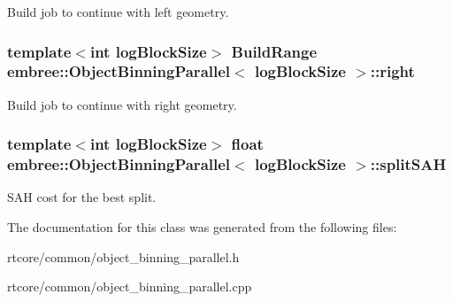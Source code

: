 Build job to continue with left geometry. 

\hypertarget{classembree_1_1_object_binning_parallel_a9bc006f56e93a16bc1d070e8db742533}{
\subsubsection[{right}]{\setlength{\rightskip}{0pt plus 5cm}template$<$int logBlockSize$>$ {\bf BuildRange} {\bf embree::ObjectBinningParallel}$<$ logBlockSize $>$::{\bf right}}}
\label{classembree_1_1_object_binning_parallel_a9bc006f56e93a16bc1d070e8db742533}


Build job to continue with right geometry. 

\hypertarget{classembree_1_1_object_binning_parallel_a41d417b66e217e9f1703404fdc57f8db}{
\subsubsection[{splitSAH}]{\setlength{\rightskip}{0pt plus 5cm}template$<$int logBlockSize$>$ float {\bf embree::ObjectBinningParallel}$<$ logBlockSize $>$::{\bf splitSAH}}}
\label{classembree_1_1_object_binning_parallel_a41d417b66e217e9f1703404fdc57f8db}


SAH cost for the best split. 



The documentation for this class was generated from the following files:\begin{DoxyCompactItemize}
\item 
rtcore/common/object\_\-binning\_\-parallel.h\item 
rtcore/common/object\_\-binning\_\-parallel.cpp\end{DoxyCompactItemize}
